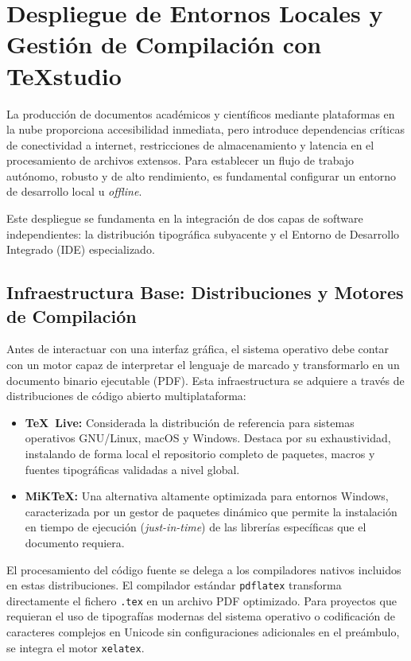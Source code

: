 \section{Despliegue de Entornos Locales y Gestión de Compilación con TeXstudio}

La producción de documentos académicos y científicos mediante plataformas en la nube proporciona accesibilidad inmediata, pero introduce dependencias críticas de conectividad a internet, restricciones de almacenamiento y latencia en el procesamiento de archivos extensos. Para establecer un flujo de trabajo autónomo, robusto y de alto rendimiento, es fundamental configurar un entorno de desarrollo local u \textit{offline}. 

Este despliegue se fundamenta en la integración de dos capas de software independientes: la distribución tipográfica subyacente y el Entorno de Desarrollo Integrado (IDE) especializado.

\subsection{Infraestructura Base: Distribuciones y Motores de Compilación}
Antes de interactuar con una interfaz gráfica, el sistema operativo debe contar con un motor capaz de interpretar el lenguaje de marcado y transformarlo en un documento binario ejecutable (PDF). Esta infraestructura se adquiere a través de distribuciones de código abierto multiplataforma:

\begin{itemize}
    \item \textbf{\TeX\ Live:} Considerada la distribución de referencia para sistemas operativos GNU/Linux, macOS y Windows. Destaca por su exhaustividad, instalando de forma local el repositorio completo de paquetes, macros y fuentes tipográficas validadas a nivel global.
    \item \textbf{MiK\TeX:} Una alternativa altamente optimizada para entornos Windows, caracterizada por un gestor de paquetes dinámico que permite la instalación en tiempo de ejecución (\textit{just-in-time}) de las librerías específicas que el documento requiera.
\end{itemize}

El procesamiento del código fuente se delega a los compiladores nativos incluidos en estas distribuciones. El compilador estándar \texttt{pdflatex} transforma directamente el fichero \texttt{.tex} en un archivo PDF optimizado. Para proyectos que requieran el uso de tipografías modernas del sistema operativo o codificación de caracteres complejos en Unicode sin configuraciones adicionales en el preámbulo, se integra el motor \texttt{xelatex}.

